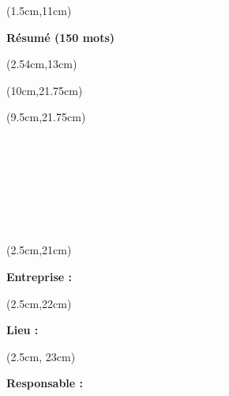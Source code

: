 \begin{titlepage}
    \begin{textblock*}{18cm}(1.5cm,11cm)
        \begin{center}
            \normalsize
            \textbf{\textcolor{bleuRoiUTT}{Résumé (150 mots)}}
        \end{center}
    \end{textblock*}

    \begin{textblock*}{16cm}(2.54cm,13cm)
        {
            \normalsize
            \makeatletter
            \setlength{\parindent}{0pt}
            \titletext
        }
    \end{textblock*}

    \begin{textblock*}{9cm}(10cm,21.75cm)
        \normalsize
        \centering
        \textbf{\textcolor{white}{Mots clés (cf Thésaurus)}}
    \end{textblock*}

    \begin{textblock*}{10cm}(9.5cm,21.75cm)
        \small
        \textcolor{white}{
            \begin{itemize}[label=\textcolor{white}{\textbullet}]
                \item \textbf{\theKone}
                \item \textbf{\theKtwo}
                \item \textbf{\theKthree}
                \item \textbf{\theKfourth}
            \end{itemize}
        }
    \end{textblock*}

    \begin{textblock*}{6.5cm}(2.5cm,21cm)
        \small
        \raggedright
        \justify
        \textbf{\textcolor{bleuRoiUTT}{Entreprise :} \theEntreprise}
    \end{textblock*}

    \begin{textblock*}{6.5cm}(2.5cm,22cm)
        \small
        \raggedright
        \justify
        \textbf{\textcolor{bleuRoiUTT}{Lieu :} \textit{\mapAddr{\theLieu}}}
    \end{textblock*}

    \begin{textblock*}{6.5cm}(2.5cm, 23cm)
        \small
        \raggedright
        \justify
        \textbf{\textcolor{bleuRoiUTT}{Responsable :} \theREntre}
    \end{textblock*}

\end{titlepage}

\clearpage %
